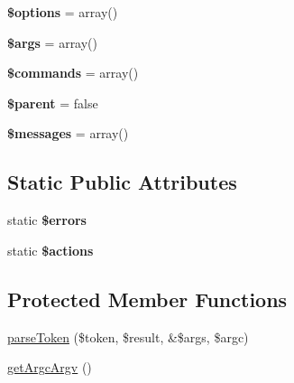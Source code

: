 \begin{DoxyCompactItemize}
\item 
\hypertarget{class_console___command_line_a011800c63ece4cbbfa77136a20607023}{
{\bfseries \$options} = array()}
\label{class_console___command_line_a011800c63ece4cbbfa77136a20607023}

\item 
\hypertarget{class_console___command_line_a67e94494731d99ed23b123e95175bc10}{
{\bfseries \$args} = array()}
\label{class_console___command_line_a67e94494731d99ed23b123e95175bc10}

\item 
\hypertarget{class_console___command_line_ab63cd62b3b65fd223b6f3d57b6ca754d}{
{\bfseries \$commands} = array()}
\label{class_console___command_line_ab63cd62b3b65fd223b6f3d57b6ca754d}

\item 
\hypertarget{class_console___command_line_a4e2313a4b35b72a06ac45fd38960f677}{
{\bfseries \$parent} = false}
\label{class_console___command_line_a4e2313a4b35b72a06ac45fd38960f677}

\item 
\hypertarget{class_console___command_line_a21a183f927a6d243fe6b4ba3a6c4d4c8}{
{\bfseries \$messages} = array()}
\label{class_console___command_line_a21a183f927a6d243fe6b4ba3a6c4d4c8}

\end{DoxyCompactItemize}
\subsection*{Static Public Attributes}
\begin{DoxyCompactItemize}
\item 
static {\bfseries \$errors}
\item 
static {\bfseries \$actions}
\end{DoxyCompactItemize}
\subsection*{Protected Member Functions}
\begin{DoxyCompactItemize}
\item 
\hyperlink{class_console___command_line_a66195e82a85ca7b74d6c70a819d47e45}{parseToken} (\$token, \$result, \&\$args, \$argc)
\item 
\hyperlink{class_console___command_line_ada6370e0887de631603cfb81f6243092}{getArgcArgv} ()
\end{DoxyCompactItemize}


